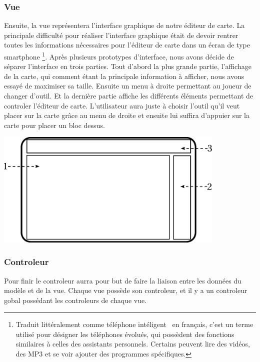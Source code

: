 	\subsubsection*{Vue}
		Ensuite, la vue représentera l'interface graphique de notre éditeur de carte. La principale difficulté pour réaliser l'interface graphique était de devoir rentrer toutes les informations nécessaires pour l'éditeur de carte dans un écran de type smartphone \footnote{Traduit littéralement comme \og téléphone intéligent \fg \, en français, c'est un terme utilisé pour désigner les téléphones évolués, qui possèdent des fonctions similaires à celles des assistants personnels. Certains peuvent lire des vidéos, des MP3 et se voir ajouter des programmes spécifiques.}. Après plusieurs prototypes d'interface, nous avons décide de séparer l'interface en trois parties. Tout d'abord la plus grande partie, l'affichage de la carte, qui comment étant la principale information à afficher, nous avons essayé de maximiser sa taille. Ensuite un menu à droite permettant au joueur de changer d'outil. Et la dernière partie affiche les différents éléments permettant de controler l'éditeur de carte. L'utilisateur aura juste à choisir l'outil qu'il veut placer sur la carte grâce au menu de droite et ensuite lui suffira d'appuier sur la carte pour placer un bloc dessus.
		
			\begin{center}
				\includegraphics[width=11cm]{./Analyse/Img/14-Editeur_de_niveau.eps}
			\end{center} 
			
			
	\subsubsection*{Controleur}
		Pour finir le controleur aurra pour but de faire la liaison entre les données du modèle et de la vue. Chaque vue possède son controleur, et il y a un controleur gobal possédant les controleurs de chaque vue.
			

